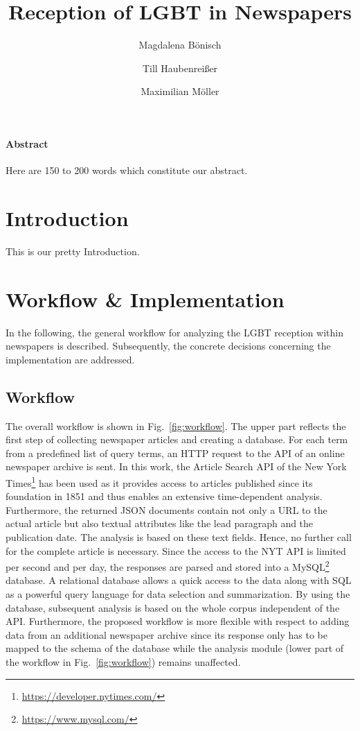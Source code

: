 \documentclass[10pt,a4paper,twocolumn]{scrartcl}
\title{Reception of LGBT in Newspapers}
\author{Magdalena Bönisch \and Till Haubenreißer \and Maximilian Möller}
\begin{document}
\onehalfspacing

\maketitle

{\footnotesize
\paragraph*{Abstract} Here are 150 to 200 words which constitute our abstract.
}


\section{Introduction}
This is our pretty Introduction.

\section{Workflow \& Implementation}
In the following, the general workflow for analyzing the LGBT reception within newspapers is described. Subsequently, the concrete decisions concerning the implementation are addressed.

\subsection*{Workflow} The overall workflow is shown in Fig.~\ref{fig:workflow}. The upper part reflects the first step of collecting newspaper articles and creating a database. For each term from a predefined list of query terms, an HTTP request to the API of an online newspaper archive is sent. In this work, the Article Search API of the New York Times\footnote{\url{https://developer.nytimes.com/}} has been used as it provides access to articles published since its foundation in 1851 and thus enables an extensive time-dependent analysis. Furthermore, the returned JSON documents contain not only a URL to the actual article but also textual attributes like the lead paragraph and the publication date. The analysis is based on these text fields. Hence, no further call for the complete article is necessary. Since the access to the NYT API is limited per second and per day, the responses are parsed and stored into a MySQL\footnote{\url{https://www.mysql.com/}} database. A relational database allows a quick access to the data along with SQL as a powerful query language for data selection and summarization. By using the database, subsequent analysis is based on the whole corpus independent of the API. Furthermore, the proposed workflow is more flexible with respect to adding data from an additional newspaper archive since its response only has to be mapped to the schema of the database while the analysis module (lower part of the workflow in Fig.~\ref{fig:workflow}) remains unaffected.
\end{document}
